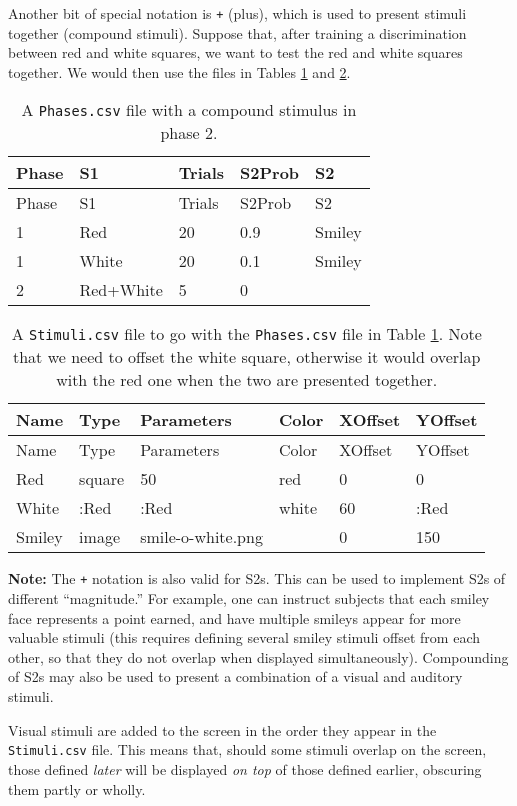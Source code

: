 \documentclass[11pt,]{article}
\begin{document}
Another bit of special notation is \texttt{+} (plus), which is used to
present stimuli together (compound stimuli). Suppose that, after
training a discrimination between red and white squares, we want to test
the red and white squares together. We would then use the files in
Tables \ref{phases-plus} and \ref{stimuli-plus}.

\begin{longtable}[c]{@{}lllll@{}}
\caption{A \texttt{Phases.csv} file with a compound stimulus in phase 2.
\label{phases-plus}}\tabularnewline
\toprule
Phase & S1 & Trials & S2Prob & S2\tabularnewline
\midrule
\endfirsthead
\toprule
Phase & S1 & Trials & S2Prob & S2\tabularnewline
\midrule
\endhead
1 & Red & 20 & 0.9 & Smiley\tabularnewline
1 & White & 20 & 0.1 & Smiley\tabularnewline
2 & Red+White & 5 & 0 &\tabularnewline
\bottomrule
\end{longtable}

\begin{longtable}[c]{@{}llllll@{}}
\caption{A \texttt{Stimuli.csv} file to go with the \texttt{Phases.csv}
file in Table \ref{phases-plus}. Note that we need to offset the white
square, otherwise it would overlap with the red one when the two are
presented together. \label{stimuli-plus}}\tabularnewline
\toprule
Name & Type & Parameters & Color & XOffset & YOffset\tabularnewline
\midrule
\endfirsthead
\toprule
Name & Type & Parameters & Color & XOffset & YOffset\tabularnewline
\midrule
\endhead
Red & square & 50 & red & 0 & 0\tabularnewline
White & :Red & :Red & white & 60 & :Red\tabularnewline
Smiley & image & smile-o-white.png & & 0 & 150\tabularnewline
\bottomrule
\end{longtable}

\textbf{Note:} The \texttt{+} notation is also valid for S2s. This can
be used to implement S2s of different ``magnitude.'' For example, one
can instruct subjects that each smiley face represents a point earned,
and have multiple smileys appear for more valuable stimuli (this
requires defining several smiley stimuli offset from each other, so that
they do not overlap when displayed simultaneously). Compounding of S2s
may also be used to present a combination of a visual and auditory
stimuli.


Visual stimuli are added to the screen in the order they appear in the
\texttt{Stimuli.csv} file. This means that, should some stimuli overlap
on the screen, those defined \emph{later} will be displayed \emph{on
top} of those defined earlier, obscuring them partly or wholly.
\end{document}
